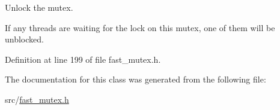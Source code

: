 Unlock the mutex. 

If any threads are waiting for the lock on this mutex, one of them will be unblocked. 

Definition at line 199 of file fast\+\_\+mutex.\+h.



The documentation for this class was generated from the following file\+:\begin{DoxyCompactItemize}
\item 
src/\hyperlink{fast__mutex_8h}{fast\+\_\+mutex.\+h}\end{DoxyCompactItemize}
